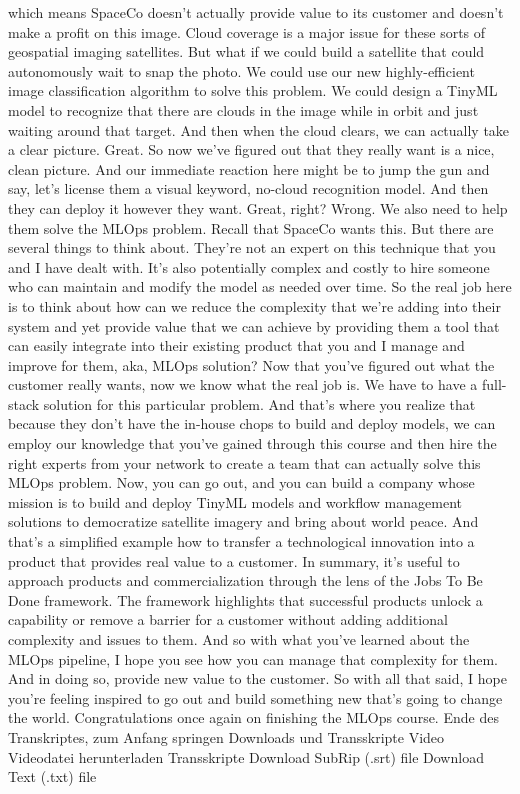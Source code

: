 {{{{{{{{    which means SpaceCo doesn't actually provide value to its customer
    and doesn't make a profit on this image.
    Cloud coverage is a major issue for these sorts of geospatial imaging
    satellites.
    But what if we could build a satellite that could autonomously
    wait to snap the photo.
    We could use our new highly-efficient image classification algorithm
    to solve this problem.
    We could design a TinyML model to recognize
    that there are clouds in the image while in orbit
    and just waiting around that target.
    And then when the cloud clears, we can actually take a clear picture.
    Great.
    So now we've figured out that they really want is a nice, clean picture.
    And our immediate reaction here might be to jump the gun and say,
    let's license them a visual keyword, no-cloud recognition model.
    And then they can deploy it however they want.
    Great, right?
    Wrong.
    We also need to help them solve the MLOps problem.
    Recall that SpaceCo wants this.
    But there are several things to think about.
    They're not an expert on this technique that you and I have dealt with.
    It's also potentially complex and costly to hire
    someone who can maintain and modify the model as needed over time.
    So the real job here is to think about how can we
    reduce the complexity that we're adding into their system
    and yet provide value that we can achieve by providing them a tool that
    can easily integrate into their existing product
    that you and I manage and improve for them, aka, MLOps solution?
    Now that you've figured out what the customer really wants,
    now we know what the real job is.
    We have to have a full-stack solution for this particular problem.
    And that's where you realize that because they
    don't have the in-house chops to build and deploy models,
    we can employ our knowledge that you've gained through this course
    and then hire the right experts from your network to create a team that
    can actually solve this MLOps problem.
    Now, you can go out, and you can build a company whose mission
    is to build and deploy TinyML models and workflow
    management solutions to democratize satellite imagery
    and bring about world peace.
    And that's a simplified example how to transfer a technological innovation
    into a product that provides real value to a customer.
    In summary, it's useful to approach products and commercialization
    through the lens of the Jobs To Be Done framework.
    The framework highlights that successful products unlock a capability
    or remove a barrier for a customer without adding additional complexity
    and issues to them.
    And so with what you've learned about the MLOps pipeline,
    I hope you see how you can manage that complexity for them.
    And in doing so, provide new value to the customer.
    So with all that said, I hope you're feeling
    inspired to go out and build something new that's going to change the world.
    Congratulations once again on finishing the MLOps course.
    Ende des Transkriptes, zum Anfang springen
    Downloads und Transskripte
    Video
    Videodatei herunterladen
    Transskripte
    Download SubRip (.srt) file
    Download Text (.txt) file

}}}}}}}}
